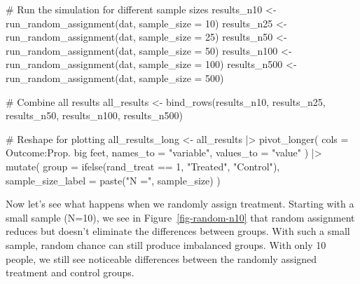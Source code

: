 \documentclass[
  letterpaper,
  DIV=11,
  numbers=noendperiod]{scrreprt}
\newenvironment{Shaded}{\begin{snugshade}}{\end{snugshade}}
\newcommand{\AttributeTok}[1]{\textcolor[rgb]{0.40,0.45,0.13}{#1}}
\newcommand{\CommentTok}[1]{\textcolor[rgb]{0.37,0.37,0.37}{#1}}
\newcommand{\DecValTok}[1]{\textcolor[rgb]{0.68,0.00,0.00}{#1}}
\newcommand{\FunctionTok}[1]{\textcolor[rgb]{0.28,0.35,0.67}{#1}}
\newcommand{\NormalTok}[1]{\textcolor[rgb]{0.00,0.23,0.31}{#1}}
\newcommand{\OtherTok}[1]{\textcolor[rgb]{0.00,0.23,0.31}{#1}}
\newcommand{\SpecialCharTok}[1]{\textcolor[rgb]{0.37,0.37,0.37}{#1}}
\newcommand{\StringTok}[1]{\textcolor[rgb]{0.13,0.47,0.30}{#1}}
\begin{document}
\begin{Shaded}
\begin{Highlighting}[]
\CommentTok{\# Run the simulation for different sample sizes}
\NormalTok{results\_n10 }\OtherTok{\textless{}{-}} \FunctionTok{run\_random\_assignment}\NormalTok{(dat, }\AttributeTok{sample\_size =} \DecValTok{10}\NormalTok{)}
\NormalTok{results\_n25 }\OtherTok{\textless{}{-}} \FunctionTok{run\_random\_assignment}\NormalTok{(dat, }\AttributeTok{sample\_size =} \DecValTok{25}\NormalTok{)}
\NormalTok{results\_n50 }\OtherTok{\textless{}{-}} \FunctionTok{run\_random\_assignment}\NormalTok{(dat, }\AttributeTok{sample\_size =} \DecValTok{50}\NormalTok{)}
\NormalTok{results\_n100 }\OtherTok{\textless{}{-}} \FunctionTok{run\_random\_assignment}\NormalTok{(dat, }\AttributeTok{sample\_size =} \DecValTok{100}\NormalTok{)}
\NormalTok{results\_n500 }\OtherTok{\textless{}{-}} \FunctionTok{run\_random\_assignment}\NormalTok{(dat, }\AttributeTok{sample\_size =} \DecValTok{500}\NormalTok{)}


\CommentTok{\# Combine all results}
\NormalTok{all\_results }\OtherTok{\textless{}{-}} \FunctionTok{bind\_rows}\NormalTok{(results\_n10, results\_n25, results\_n50, }
\NormalTok{  results\_n100, results\_n500)}

\CommentTok{\# Reshape for plotting}
\NormalTok{all\_results\_long }\OtherTok{\textless{}{-}}\NormalTok{ all\_results }\SpecialCharTok{|\textgreater{}}
  \FunctionTok{pivot\_longer}\NormalTok{(}
    \AttributeTok{cols =}\NormalTok{ Outcome}\SpecialCharTok{:}\StringTok{\textasciigrave{}}\AttributeTok{Prop. big feet}\StringTok{\textasciigrave{}}\NormalTok{,}
    \AttributeTok{names\_to =} \StringTok{"variable"}\NormalTok{,}
    \AttributeTok{values\_to =} \StringTok{"value"}
\NormalTok{  ) }\SpecialCharTok{|\textgreater{}}
  \FunctionTok{mutate}\NormalTok{(}
    \AttributeTok{group =} \FunctionTok{ifelse}\NormalTok{(rand\_treat }\SpecialCharTok{==} \DecValTok{1}\NormalTok{, }\StringTok{"Treated"}\NormalTok{, }\StringTok{"Control"}\NormalTok{),}
    \AttributeTok{sample\_size\_label =} \FunctionTok{paste}\NormalTok{(}\StringTok{"N ="}\NormalTok{, sample\_size)}
\NormalTok{  )}
\end{Highlighting}
\end{Shaded}

Now let's see what happens when we randomly assign treatment. Starting
with a small sample (N=10), we see in Figure~\ref{fig-random-n10} that
random assignment reduces but doesn't eliminate the differences between
groups. With such a small sample, random chance can still produce
imbalanced groups. With only 10 people, we still see noticeable
differences between the randomly assigned treatment and control groups.
\end{document}
